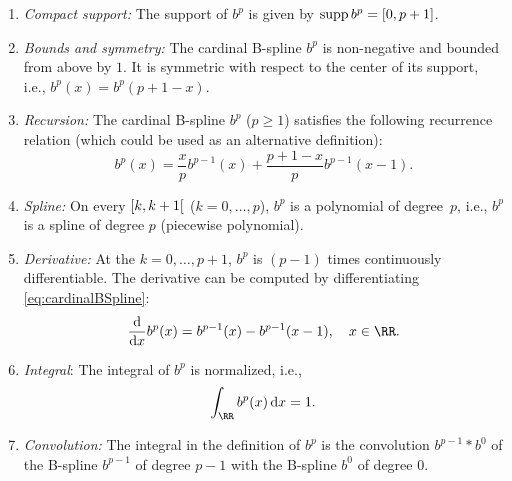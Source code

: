\begin{enumerate}
  \item
  \emph{Compact support:}
  The support of $b^p$ is given by $\operatorname{supp} b^p = [0, p + 1]$.
  
  \item
  \emph{Bounds and symmetry:}
  The cardinal B-spline $b^p$ is non-negative and bounded from above by $1$.
  It is symmetric with respect to the center of its support, i.e.,
  $b^p(x) = b^p(p + 1 - x)$.
  
  \item
  \emph{Recursion:}
  The cardinal B-spline $b^p$ ($p \ge 1$) satisfies the following recurrence
  relation
  (which could be used as an alternative definition):
  \begin{equation}
    b^p(x)
    = \frac{x}{p} b^{p-1}(x) + \frac{p+1-x}{p} b^{p-1}(x-1).
  \end{equation}
  
  \item
  \emph{Spline:}
  On every  $\mathopen[k, k+1\mathclose[$
  ($k = 0, \dotsc, p$), $b^p$ is a polynomial of degree~$p$, i.e.,
  $b^p$ is a spline of degree $p$ (piecewise polynomial).
  
  \item
  \emph{Derivative:}
  At the  $k = 0, \dotsc, p + 1$,
  $b^p$ is $(p - 1)$ times continuously differentiable.
  The derivative can be computed by differentiating
  \eqref{eq:cardinalBSpline}:
  \begin{equation}
    \label{eq:cardinalBSplineDerivative}
    \frac{\diff}{\dx} b^p(x)
    = b^{p-1}(x) - b^{p-1}(x-1),\quad
    x \in \RR.
  \end{equation}
  
  \item
  \emph{Integral}:
  The integral of $b^p$ is normalized, i.e.,
  \begin{equation}
    \int_\RR b^p(x) \dx = 1.
  \end{equation}
  
  \item
  \emph{Convolution:}
  The integral in the definition of $b^p$
  is the convolution $b^{p-1} \ast b^0$ of the B-spline $b^{p-1}$
  of degree $p - 1$ with the B-spline $b^0$ of degree $0$.
  

\end{enumerate}
